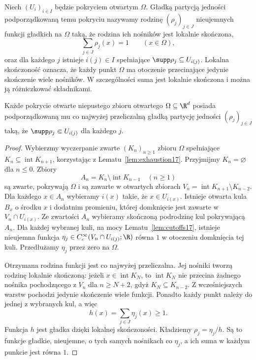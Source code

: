 \begin{definicja}
\label{def:dt-smooth-partition}
Niech $(U_i)_{i\in I}$ będzie pokryciem otwartym $\Omega$.
Gładką partycją jedności podporządkowaną temu pokryciu
nazywamy rodzinę $(\rho_j)_{j\in J}$ nieujemnych funkcji
gładkich na $\Omega$ taką, że rodzina ich nośników
jest lokalnie skończona,
\[
 \sum_{j\in J}\rho_j(x)=1 \qquad(x\in\Omega),
\]
oraz dla każdego $j$ istnieje $i(j)\in I$ spełniające
$\supp\rho_j\subseteq U_{i(j)}$.
Lokalna skończoność oznacza, że każdy punkt $\Omega$
ma otoczenie przecinające jedynie skończenie wiele
nośników. W szczególności suma jest lokalnie skończona
i można ją różniczkować składnikami.
\end{definicja}

\begin{twierdzenie}
\label{thm:dt-smooth-partition}
Każde pokrycie otwarte niepustego zbioru otwartego
$\Omega\subseteq\R^d$ posiada podporządkowaną mu
co najwyżej przeliczalną gładką partycję jedności
$(\rho_j)_{j\in J}$ taką, że
$\supp\rho_j\Subset U_{i(j)}$ dla każdego $j$.
\end{twierdzenie}
\begin{proof}
Wybierzmy wyczerpanie zwarte $(K_n)_{n\ge1}$ zbioru
$\Omega$ spełniające $K_n\subseteq\operatorname{int}K_{n+1}$,
korzystając z Lematu~\ref{lem:exhaustion17}.
Przyjmijmy $K_n=\varnothing$ dla $n\le0$. Zbiory
\[
 A_n=K_n\setminus\operatorname{int}K_{n-1}
 \quad(n\ge1)
\]
są zwarte, pokrywają $\Omega$ i są zawarte w otwartych
zbiorach
$V_n=\operatorname{int}K_{n+1}\setminus K_{n-2}$.
Dla każdego $x\in A_n$ wybieramy $i(x)$ takie, że
$x\in U_{i(x)}$. Istnieje otwarta kula $B_x$ o środku
$x$ i dodatnim promieniu, której domknięcie jest
zawarte w $V_n\cap U_{i(x)}$. Ze zwartości $A_n$
wybieramy skończoną podrodzinę kul pokrywającą $A_n$.
Dla każdej wybranej kuli, na mocy
Lematu~\ref{lem:cutoffs17}, istnieje nieujemna
funkcja $\eta_j\in C_c^\infty(V_n\cap U_{i(j)};\R)$
równa $1$ w otoczeniu domknięcia tej kuli.
Przedłużamy $\eta_j$ przez zero na $\Omega$.

Otrzymana rodzina funkcji jest co najwyżej przeliczalna.
Jej nośniki tworzą rodzinę lokalnie skończoną:
jeżeli $x\in\operatorname{int}K_N$, to
$\operatorname{int}K_N$ nie przecina żadnego nośnika
pochodzącego z $V_n$ dla $n\ge N+2$, gdyż
$K_N\subseteq K_{n-2}$. Z wcześniejszych warstw
pochodzi jedynie skończenie wiele funkcji.
Ponadto każdy punkt należy do jednej z wybranych kul,
a więc
\[
 h(x)=\sum_{j\in J}\eta_j(x)\ge1.
\]
Funkcja $h$ jest gładka dzięki lokalnej skończoności.
Kładziemy $\rho_j=\eta_j/h$. Są to funkcje gładkie,
nieujemne, o tych samych nośnikach co $\eta_j$, a ich
suma w każdym punkcie jest równa $1$.
\end{proof}

